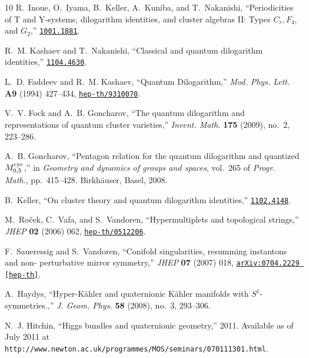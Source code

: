 \documentclass[12pt,reqno]{article}
\numberwithin{equation}{section}
\numberwithin{equation}{section}
\begin{document}
\begin{thebibliography}{10}
R.~Inoue, O.~Iyama, B.~Keller, A.~Kuniba, and T.~Nakanishi, ``{Periodicities of
  T and Y-systems, dilogarithm identities, and cluster algebras II: Types $C_r,
  F_4$, and $G_2$},''
\href{http://www.arXiv.org/abs/1001.1881}{{\tt 1001.1881}}.

R.~M. Kashaev and T.~Nakanishi, ``{Classical and quantum dilogarithm
  identities},''
\href{http://www.arXiv.org/abs/1104.4630}{{\tt 1104.4630}}.

L.~D. Faddeev and R.~M. Kashaev, ``{Quantum Dilogarithm},'' {\em Mod. Phys.
  Lett.} {\bf A9} (1994) 427--434,
\href{http://www.arXiv.org/abs/hep-th/9310070}{{\tt hep-th/9310070}}.

V.~V. Fock and A.~B. Goncharov, ``The quantum dilogarithm and representations
  of quantum cluster varieties,'' {\em Invent. Math.} {\bf 175} (2009), no.~2,
  223--286.

A.~B. Goncharov, ``Pentagon relation for the quantum dilogarithm and quantized
  {$M_{0,5}^{\rm cyc}$},'' in {\em Geometry and dynamics of groups and spaces},
  vol.~265 of {\em Progr. Math.}, pp.~415--428.
\newblock Birkh\"auser, Basel, 2008.

B.~Keller, ``{On cluster theory and quantum dilogarithm identities},''
\href{http://www.arXiv.org/abs/1102.4148}{{\tt 1102.4148}}.

M.~Ro\v{c}ek, C.~Vafa, and S.~Vandoren, ``Hypermultiplets and topological
  strings,'' {\em JHEP} {\bf 02} (2006) 062,
\href{http://www.arXiv.org/abs/hep-th/0512206}{{\tt hep-th/0512206}}.

F.~Saueressig and S.~Vandoren, ``{Conifold singularities, resumming instantons
  and non- perturbative mirror symmetry},'' {\em JHEP} {\bf 07} (2007) 018,
\href{http://www.arXiv.org/abs/arXiv:0704.2229 [hep-th]}{{\tt arXiv:0704.2229
  [hep-th]}}.

A.~Haydys, ``{Hyper-K\"ahler and quaternionic K\"ahler manifolds with
  $S^{1}$-symmetries.},'' {\em J. Geom. Phys.} {\bf 58} (2008), no.~3,
  293--306.

N.~J. Hitchin, ``{H}iggs bundles and quaternionic geometry,'' 2011.
\newblock Available as of July 2011 at {\tt
  \verb+http://www.newton.ac.uk/programmes/MOS/seminars/070111301.html+}.


\end{thebibliography}
\end{document}

